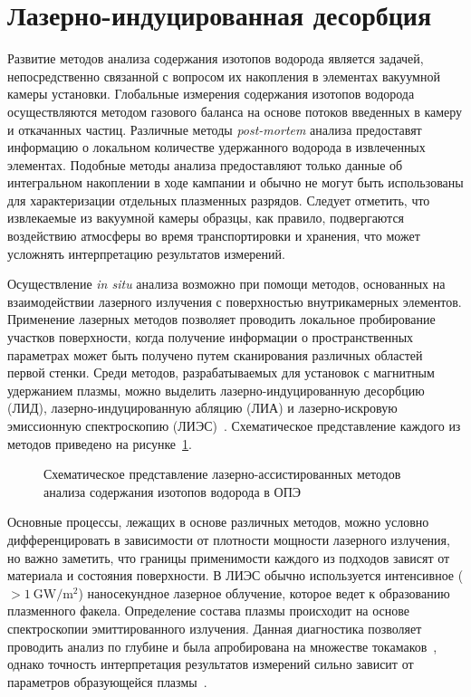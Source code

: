 \section{Лазерно-индуцированная десорбция}\label{sec:ch1/sec6}

Развитие методов анализа содержания изотопов водорода является задачей, непосредственно связанной с вопросом их накопления в элементах вакуумной камеры установки. Глобальные измерения содержания изотопов водорода осуществляются методом газового баланса на основе потоков введенных в камеру и откачанных частиц. Различные методы \textit{post-mortem} анализа предоставят информацию о локальном количестве удержанного водорода в извлеченных элементах. Подобные методы анализа предоставляют только данные об интегральном накоплении в ходе кампании и обычно не могут быть использованы для характеризации отдельных плазменных разрядов. Следует отметить, что извлекаемые из вакуумной камеры образцы, как правило, подвергаются воздействию атмосферы во время транспортировки и хранения, что может усложнять интерпретацию результатов измерений.

Осуществление \textit{in situ} анализа возможно при помощи методов, основанных на взаимодействии лазерного излучения с поверхностью внутрикамерных элементов. Применение лазерных методов позволяет проводить локальное пробирование участков поверхности, когда получение информации о пространственных параметрах может быть получено путем сканирования различных областей первой стенки. Среди методов, разрабатываемых для установок с магнитным удержанием плазмы, можно выделить лазерно-индуцированную десорбцию (ЛИД), лазерно-индуцированную абляцию (ЛИА) и лазерно-искровую эмиссионную спектроскопию (ЛИЭС)~\cite{Philipps2013,Mukhin2016}. Схематическое представление каждого из методов приведено на рисунке~\cref{fig:ch1/laser_methods}.

\begin{figure}[ht]
    \caption{Схематическое представление лазерно-ассистированных методов анализа содержания изотопов водорода в ОПЭ}\label{fig:ch1/laser_methods}
\end{figure}

Основные процессы, лежащих в основе различных методов, можно условно дифференцировать в зависимости от плотности мощности лазерного излучения, но важно заметить, что границы применимости каждого из подходов зависят от материала и состояния поверхности. В ЛИЭС обычно используется интенсивное (\( >\SI{1}{\giga\watt\per\meter\squared} \)) наносекундное лазерное облучение, которое ведет к образованию плазменного факела. Определение состава плазмы происходит на основе спектроскопии эмиттированного излучения. Данная диагностика позволяет проводить анализ по глубине и была апробирована на множестве токамаков~\cite{Xiao2015,Semerok2016,Imran2023,Favre2024}, однако точность интерпретация результатов измерений сильно зависит от параметров образующейся плазмы~\cite{Marenkov2021}. 


